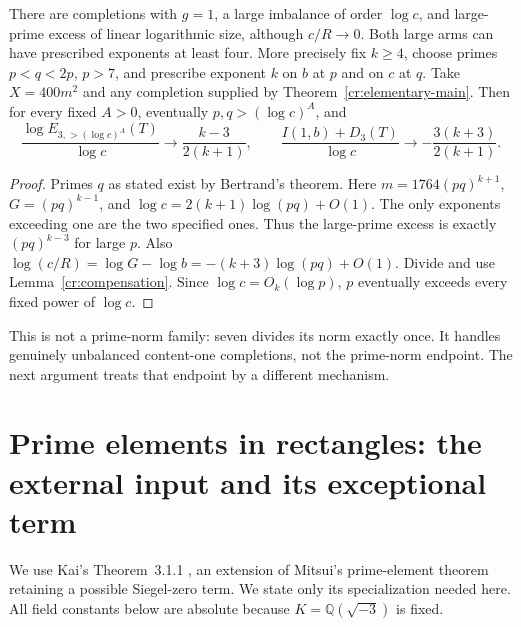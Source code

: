 \begin{corollary}
\label{cr:two-losses}
There are completions with $g=1$, a large imbalance of order $\log c$, and
large-prime excess of linear logarithmic size, although $c/R\to0$.
Both large arms can have prescribed exponents at least four.
More precisely fix $k\ge4$, choose primes $p<q<2p$, $p>7$, and prescribe
exponent $k$ on $b$ at $p$ and on $c$ at $q$. Take $X=400m^2$ and any
completion supplied by Theorem~\ref{cr:elementary-main}. Then for every fixed
$A>0$, eventually $p,q>(\log c)^A$, and
\[
 \frac{\log E_{3,>(\log c)^A}(T)}{\log c}
 \longrightarrow\frac{k-3}{2(k+1)},\qquad
 \frac{I(1,b)+D_3(T)}{\log c}
 \longrightarrow-\frac{3(k+3)}{2(k+1)}.
\]
\end{corollary}
\begin{proof}
Primes $q$ as stated exist by Bertrand's theorem. Here
$m=1764(pq)^{k+1}$, $G=(pq)^{k-1}$, and
$\log c=2(k+1)\log(pq)+O(1)$. The only exponents exceeding one are the two
specified ones. Thus the large-prime excess is exactly $(pq)^{k-3}$ for large
$p$. Also $\log(c/R)=\log G-\log b=-(k+3)\log(pq)+O(1)$.
Divide and use Lemma~\ref{cr:compensation}. Since $\log c=O_k(\log p)$,
$p$ eventually exceeds every fixed power of $\log c$.
\end{proof}
This is not a prime-norm family: seven divides its norm exactly once. It
handles genuinely unbalanced content-one completions, not the prime-norm
endpoint. The next argument treats that endpoint by a different mechanism.

\section{Prime elements in rectangles: the external input and its exceptional term}
\label{cr:prime-input}
We use Kai's Theorem~3.1.1 \cite{CRKai2023}, an extension of Mitsui's prime-element
theorem retaining a possible Siegel-zero term. We state only its specialization
needed here. All field constants below are absolute because
$K=\mathbb Q(\sqrt{-3})$ is fixed.

